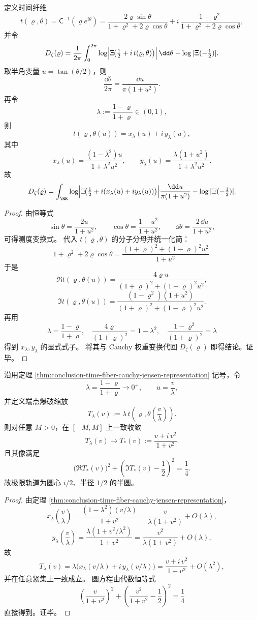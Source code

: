 \begin{theorem}\label{thm:conclusion-time-fiber-cauchy-jensen-representation}
定义时间纤维
\[
t(\varrho,\theta)
=
\mathsf C^{-1}(\varrho e^{i\theta})
=
\frac{2\varrho\sin\theta}{1+\varrho^2+2\varrho\cos\theta}
+
i\,\frac{1-\varrho^2}{1+\varrho^2+2\varrho\cos\theta},
\]
并令
\[
D_\zeta(\varrho)
=
\frac1{2\pi}\int_0^{2\pi}
\log\Bigl|\Xi\!\bigl(\tfrac12+i\,t(\varrho,\theta)\bigr)\Bigr|\,\dd\theta
-\log|\Xi(-\tfrac12)|.
\]
取半角变量 \(u=\tan(\theta/2)\)，则
\[
\frac{\dd\theta}{2\pi}=\frac{\dd u}{\pi(1+u^2)}.
\]
再令
\[
\lambda:=\frac{1-\varrho}{1+\varrho}\in(0,1),
\]
则
\[
t(\varrho,\theta(u))=x_\lambda(u)+i\,y_\lambda(u),
\]
其中
\[
x_\lambda(u)=\frac{(1-\lambda^2)u}{1+\lambda^2u^2},\qquad
y_\lambda(u)=\frac{\lambda(1+u^2)}{1+\lambda^2u^2}.
\]
故
\[
D_\zeta(\varrho)
=
\int_{\RR}
\log\Bigl|\Xi\!\bigl(\tfrac12+i(x_\lambda(u)+iy_\lambda(u))\bigr)\Bigr|
\frac{\dd u}{\pi(1+u^2)}
-\log|\Xi(-\tfrac12)|.
\]
\end{theorem}
\begin{proof}
由恒等式
\[
\sin\theta=\frac{2u}{1+u^2},\qquad
\cos\theta=\frac{1-u^2}{1+u^2},\qquad
\dd\theta=\frac{2\,\dd u}{1+u^2},
\]
可得测度变换式。
代入 \(t(\varrho,\theta)\) 的分子分母并统一化简：
\[
1+\varrho^2+2\varrho\cos\theta
=
\frac{(1+\varrho)^2+(1-\varrho)^2u^2}{1+u^2}.
\]
于是
\[
\Re t(\varrho,\theta(u))
=
\frac{4\varrho u}{(1+\varrho)^2+(1-\varrho)^2u^2},
\]
\[
\Im t(\varrho,\theta(u))
=
\frac{(1-\varrho^2)(1+u^2)}{(1+\varrho)^2+(1-\varrho)^2u^2}.
\]
再用
\[
\lambda=\frac{1-\varrho}{1+\varrho},\quad
\frac{4\varrho}{(1+\varrho)^2}=1-\lambda^2,\quad
\frac{1-\varrho^2}{(1+\varrho)^2}=\lambda
\]
得到 \(x_\lambda,y_\lambda\) 的显式式子。
将其与 Cauchy 权重变换代回 \(D_\zeta(\varrho)\) 即得结论。证毕。
\end{proof}

\begin{theorem}[端点爆破的普适半圆极限]\label{thm:conclusion-time-fiber-endpoint-universal-semicircle}
沿用定理 \ref{thm:conclusion-time-fiber-cauchy-jensen-representation} 记号，令
\[
\lambda=\frac{1-\varrho}{1+\varrho}\to 0^+,\qquad
u=\frac{v}{\lambda},
\]
并定义端点爆破缩放
\[
T_\lambda(v):=\lambda\,t\!\left(\varrho,\theta\!\left(\frac{v}{\lambda}\right)\right).
\]
则对任意 \(M>0\)，在 \([-M,M]\) 上一致收敛
\[
T_\lambda(v)\longrightarrow T_\ast(v):=\frac{v+i\,v^2}{1+v^2}.
\]
且其像满足
\[
\bigl(\Re T_\ast(v)\bigr)^2+\left(\Im T_\ast(v)-\frac12\right)^2=\frac14.
\]
故极限轨道为圆心 \(i/2\)、半径 \(1/2\) 的半圆。
\end{theorem}
\begin{proof}
由定理 \ref{thm:conclusion-time-fiber-cauchy-jensen-representation}，
\[
x_\lambda\!\left(\frac{v}{\lambda}\right)
=
\frac{(1-\lambda^2)(v/\lambda)}{1+v^2}
=
\frac{v}{\lambda(1+v^2)}+O(\lambda),
\]
\[
y_\lambda\!\left(\frac{v}{\lambda}\right)
=
\frac{\lambda(1+v^2/\lambda^2)}{1+v^2}
=
\frac{v^2}{\lambda(1+v^2)}+O(\lambda),
\]
故
\[
T_\lambda(v)
=
\lambda\bigl(x_\lambda(v/\lambda)+i\,y_\lambda(v/\lambda)\bigr)
=
\frac{v+i\,v^2}{1+v^2}+O(\lambda^2),
\]
并在任意紧集上一致成立。
圆方程由代数恒等式
\[
\left(\frac{v}{1+v^2}\right)^2
+
\left(\frac{v^2}{1+v^2}-\frac12\right)^2
=\frac14
\]
直接得到。证毕。
\end{proof}

